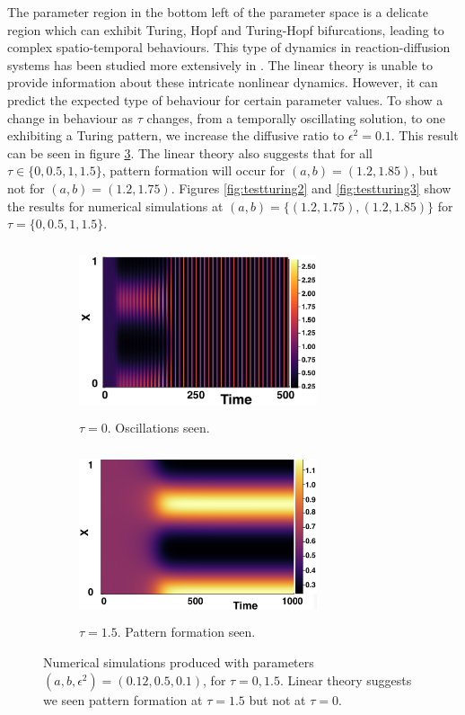 The parameter region in the bottom left of the parameter space is a delicate region which can exhibit Turing, Hopf and Turing-Hopf bifurcations, leading to complex spatio-temporal behaviours. This type of dynamics in reaction-diffusion systems has been studied more extensively in \cite{krausefixed,jiang}. The linear theory is unable to provide information about these intricate nonlinear dynamics. However, it can predict the expected type of behaviour for certain parameter values. To show a change in behaviour as $\tau$ changes, from a temporally oscillating solution, to one exhibiting a Turing pattern, we increase the diffusive ratio to $\epsilon^2=0.1$. This result can be seen in figure \ref{fig:testturing}. The linear theory also suggests that for all $\tau\in\{0,0.5,1,1.5\}$, pattern formation will occur for $(a,b)=(1.2,1.85)$, but not for $(a,b)=(1.2,1.75)$. Figures \ref{fig:testturing2} and \ref{fig:testturing3} show the results for numerical simulations at $(a,b)=\{(1.2,1.75),(1.2,1.85)\}$ for $\tau=\{0,0.5,1,1.5\}$.
\begin{figure}[h]
    \centering
    \begin{subfigure}[b]{0.45\textwidth}
        \centering
        \includegraphics[width=7cm,height=5cm]{toscill.png}
        \caption{$\tau=0$. Oscillations seen.}
        \label{}
    \end{subfigure}
    \hfill
    \begin{subfigure}[b]{0.45\textwidth}
        \centering
        \includegraphics[width=7cm,height=5cm]{tpattpred.png}
        \caption{$\tau=1.5$. Pattern formation seen.}
        \label{}
    \end{subfigure}
    \caption{Numerical simulations produced with parameters $(a,b,\epsilon^2)=(0.12,0.5,0.1)$, for $\tau=0,1.5$. Linear theory suggests we seen pattern formation at $\tau=1.5$ but not at $\tau=0$.}
    \label{fig:testturing}
\end{figure}

